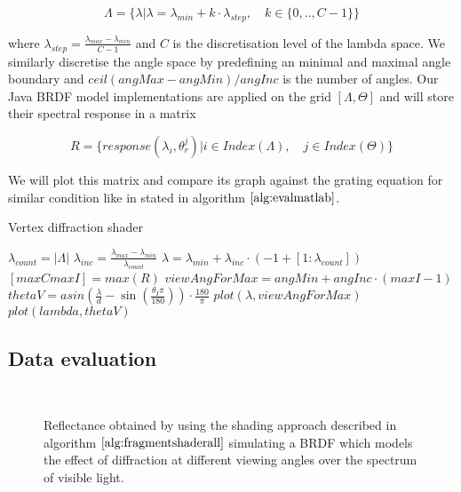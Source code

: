 \begin{equation}
\Lambda = \{\lambda | \lambda = \lambda_{min} + k \cdot \lambda_{step}, \quad k \in \{0,..,C-1\}\}
\label{eq:lambdaspacesetup}
\end{equation}

where $\lambda_{step} = \frac{\lambda_{max}-\lambda_{min}}{C-1}$ and $C$ is the discretisation level of the lambda space. We similarly discretise the angle space by predefining an minimal and maximal angle boundary and $ceil(angMax - angMin) / angInc$ is the number of angles. Our Java BRDF model implementations are applied on the grid $[\Lambda, \Theta]$ and will store their spectral response in a matrix

\begin{equation} 
R = \{response(\lambda_i, \theta_{r}^{j}) | i \in Index(\Lambda), \quad j \in Index(\Theta)\}
\label{eq:responsematrix}
\end{equation}

We will plot this matrix and compare its graph against the grating equation for similar condition like in stated in algorithm $\ref{alg:evalmatlab}$.

\begin{algorithm}[H]
  \caption{Vertex diffraction shader}
  \begin{algorithmic}
    \State $ \lambda_{count} = |\Lambda| $
    \State $ \lambda_{inc} = \frac{\lambda_{max}-\lambda_{min}}{\lambda_{count}}$
    \State $ \lambda = \lambda_{min} + \lambda_{inc} \cdot (-1+[1:\lambda_{count}])$
    \State $ [maxC maxI] = max(R)$
    \State $ viewAngForMax = angMin + angInc \cdot (maxI-1)$
    \State $ thetaV = asin \left( \frac{\lambda}{d} - \sin \left(  \frac{\theta_I \pi}{180} \right) \right) \cdot \frac{180}{\pi}$
    \State $ plot(\lambda, viewAngForMax)$
    \State $ plot(lambda, thetaV)$
  \end{algorithmic}
\label{alg:evalmatlab}
\end{algorithm}

\subsection{Data evaluation}

\begin{figure}[H]
  \centering
~
~

\caption{Reflectance obtained by using the shading approach described in algorithm $\ref{alg:fragmentshaderall}$ simulating a BRDF which models the effect of diffraction at different viewing angles over the spectrum of visible light.}

\label{fig:evaluationdiffshaderalllambda}
\end{figure}

